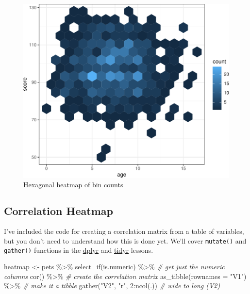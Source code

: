 \documentclass[
  oneside]{book}
\newenvironment{Shaded}{\begin{snugshade}}{\end{snugshade}}
\newcommand{\AttributeTok}[1]{\textcolor[rgb]{0.77,0.63,0.00}{#1}}
\newcommand{\CommentTok}[1]{\textcolor[rgb]{0.56,0.35,0.01}{\textit{#1}}}
\newcommand{\DecValTok}[1]{\textcolor[rgb]{0.00,0.00,0.81}{#1}}
\newcommand{\FunctionTok}[1]{\textcolor[rgb]{0.00,0.00,0.00}{#1}}
\newcommand{\NormalTok}[1]{#1}
\newcommand{\OtherTok}[1]{\textcolor[rgb]{0.56,0.35,0.01}{#1}}
\newcommand{\SpecialCharTok}[1]{\textcolor[rgb]{0.00,0.00,0.00}{#1}}
\newcommand{\StringTok}[1]{\textcolor[rgb]{0.31,0.60,0.02}{#1}}
\begin{document}
\begin{figure}

{\centering \includegraphics[width=0.9\linewidth]{images/overplot-hex-1} 

}

\caption{Hexagonal heatmap of bin counts}\label{fig:overplot-hex}
\end{figure}

\hypertarget{geom_tile}{%
\subsection{Correlation Heatmap}\label{geom_tile}}

I've included the code for creating a correlation matrix from a table of variables, but you don't need to understand how this is done yet. We'll cover \texttt{mutate()} and \texttt{gather()} functions in the \protect\hyperlink{dplyr}{dplyr} and \protect\hyperlink{tidyr}{tidyr} lessons.

\begin{Shaded}
\begin{Highlighting}[]
\NormalTok{heatmap }\OtherTok{\textless{}{-}}\NormalTok{ pets }\SpecialCharTok{\%\textgreater{}\%}
  \FunctionTok{select\_if}\NormalTok{(is.numeric) }\SpecialCharTok{\%\textgreater{}\%} \CommentTok{\# get just the numeric columns}
  \FunctionTok{cor}\NormalTok{() }\SpecialCharTok{\%\textgreater{}\%} \CommentTok{\# create the correlation matrix}
  \FunctionTok{as\_tibble}\NormalTok{(}\AttributeTok{rownames =} \StringTok{"V1"}\NormalTok{) }\SpecialCharTok{\%\textgreater{}\%} \CommentTok{\# make it a tibble}
  \FunctionTok{gather}\NormalTok{(}\StringTok{"V2"}\NormalTok{, }\StringTok{"r"}\NormalTok{, }\DecValTok{2}\SpecialCharTok{:}\FunctionTok{ncol}\NormalTok{(.)) }\CommentTok{\# wide to long (V2)}
\end{Highlighting}
\end{Shaded}
\end{document}
